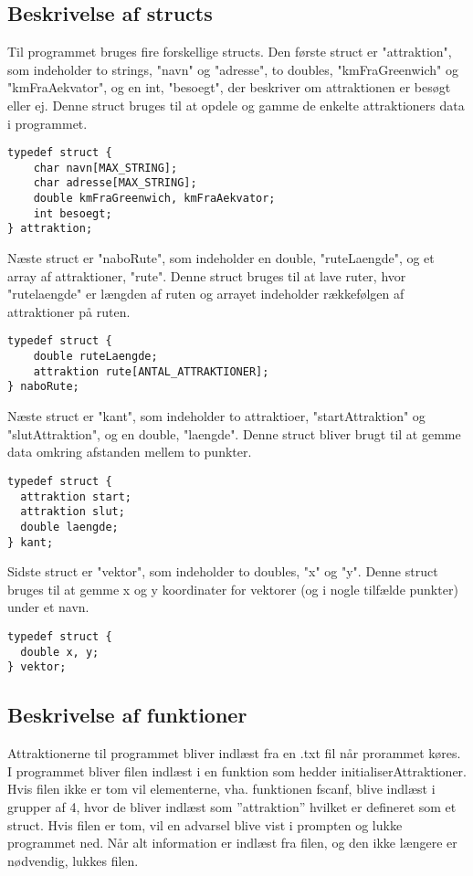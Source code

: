 \subsection{Beskrivelse af structs}
Til programmet bruges fire forskellige structs. Den første struct er "attraktion", som indeholder to strings, "navn" og "adresse", to doubles, "kmFraGreenwich" og "kmFraAekvator", og en int, "besoegt", der beskriver om attraktionen er besøgt eller ej. Denne struct bruges til at opdele og gamme de enkelte attraktioners data i programmet.

\begin{lstlisting}
typedef struct {
	char navn[MAX_STRING];
	char adresse[MAX_STRING]; 
	double kmFraGreenwich, kmFraAekvator;
	int besoegt;
} attraktion;
\end{lstlisting} 

Næste struct er "naboRute", som indeholder en double, "ruteLaengde", og et array af attraktioner, "rute". Denne struct bruges til at lave ruter, hvor "rutelaengde" er længden af ruten og arrayet indeholder rækkefølgen af attraktioner på ruten.

\begin{lstlisting}
typedef struct {
	double ruteLaengde;
	attraktion rute[ANTAL_ATTRAKTIONER];
} naboRute;
\end{lstlisting}

Næste struct er "kant", som indeholder to attraktioer, "startAttraktion" og "slutAttraktion", og en double, "laengde". Denne struct bliver brugt til at gemme data omkring afstanden mellem to punkter.

\begin{lstlisting}
typedef struct {
  attraktion start;
  attraktion slut;
  double laengde;
} kant;
\end{lstlisting}

Sidste struct er "vektor", som indeholder to doubles, "x" og "y". Denne struct bruges til at gemme x og y koordinater for vektorer (og i nogle tilfælde punkter) under et navn.

\begin{lstlisting}
typedef struct {
  double x, y;
} vektor;
\end{lstlisting}

\subsection{Beskrivelse af funktioner}
Attraktionerne til programmet bliver indlæst fra en .txt fil når prorammet køres. I programmet bliver filen indlæst i en funktion som hedder initialiserAttraktioner. Hvis filen ikke er tom vil elementerne, vha. funktionen fscanf, blive indlæst i grupper af 4, hvor de bliver indlæst som ”attraktion” hvilket er defineret som et struct. Hvis filen er tom, vil en advarsel blive vist i prompten og lukke programmet ned. Når alt information er indlæst fra filen, og den ikke længere er nødvendig, lukkes filen.

